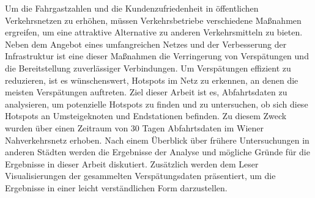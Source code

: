 Um die Fahrgastzahlen und die Kundenzufriedenheit in öffentlichen Verkehrsnetzen zu erhöhen, müssen Verkehrsbetriebe verschiedene Maßnahmen ergreifen, um eine attraktive Alternative zu anderen Verkehrsmitteln zu bieten. Neben dem Angebot eines umfangreichen Netzes und der Verbesserung der Infrastruktur ist eine dieser Maßnahmen die Verringerung von Verspätungen und die Bereitstellung zuverlässiger Verbindungen. Um Verspätungen effizient zu reduzieren, ist es wünschenswert, Hotspots im Netz zu erkennen, an denen die meisten Verspätungen auftreten. Ziel dieser Arbeit ist es, Abfahrtsdaten zu analysieren, um potenzielle Hotspots zu finden und zu untersuchen, ob sich diese Hotspots an Umsteigeknoten und Endstationen befinden. Zu diesem Zweck wurden über einen Zeitraum von 30 Tagen Abfahrtsdaten im Wiener Nahverkehrsnetz erhoben. Nach einem Überblick über frühere Untersuchungen in anderen Städten werden die Ergebnisse der Analyse und mögliche Gründe für die Ergebnisse in dieser Arbeit diskutiert. Zusätzlich werden dem Leser Visualisierungen der gesammelten Verspätungsdaten präsentiert, um die Ergebnisse in einer leicht verständlichen Form darzustellen.